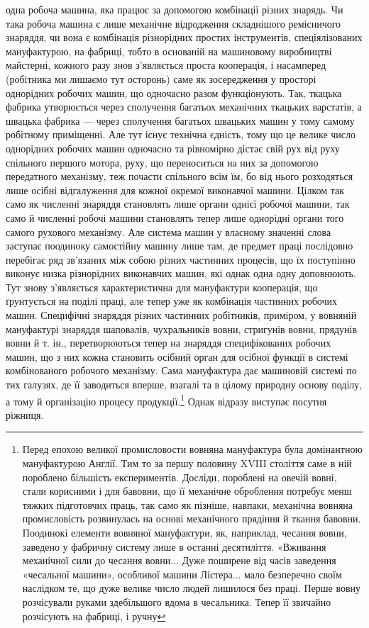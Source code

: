 \parcont{}  %
одна робоча машина, яка працює за допомогою комбінації різних
знарядь. Чи така робоча машина є лише механічне відродження
складнішого ремісничого знаряддя, чи вона є комбінація різнорідних
простих інструментів, спеціялізованих мануфактурою, на
фабриці, тобто в основаній на машиновому виробництві майстерні,
кожного разу знов з’являється проста кооперація, і насамперед
(робітника ми лишаємо тут осторонь) саме як зосередження у просторі
однорідних робочих машин, що одночасно разом функціонують.
Так, ткацька фабрика утворюється через сполучення
багатьох механічних ткацьких варстатів, а швацька фабрика —
через сполучення багатьох швацьких машин у тому самому робітному
приміщенні. Але тут існує технічна єдність, тому що це
велике число однорідних робочих машин одночасно та рівномірно
дістає свій рух від руху спільного першого мотора, руху, що
переноситься на них за допомогою передатного механізму, теж
почасти спільного всім їм, бо від нього розходяться лише осібні
відгалуження для кожної окремої виконавчої машини. Цілком
так само як численні знаряддя становлять лише органи однієї
робочої машини, так само й численні робочі машини становлять
тепер лише однорідні органи того самого рухового механізму.
Але система машин у власному значенні слова заступає
поодиноку самостійну машину лише там, де предмет праці послідовно
перебігає ряд зв’язаних між собою різних частинних
процесів, що їх поступінно виконує низка різнорідних виконавчих
машин, які однак одна одну доповнюють. Тут знову з’являється
характеристична для мануфактури кооперація, що ґрунтується
на поділі праці, але тепер уже як комбінація частинних
робочих машин. Специфічні знаряддя різних частинних робітників,
приміром, у вовняній мануфактурі знаряддя шаповалів,
чухральників вовни, стригунів вовни, прядунів вовни й т. ін.,
перетворюються тепер на знаряддя специфікованих робочих машин,
що з них кожна становить осібний орган для осібної функції
в системі комбінованого робочого механізму. Сама мануфактура
дає машиновій системі по тих галузях, де її заводиться вперше,
взагалі та в цілому природну основу поділу, а тому й організацію
процесу продукції.\footnote{
Перед епохою великої промисловости вовняна мануфактура була
домінантною мануфактурою Англії. Тим то за першу половину XVIII століття
саме в ній пороблено більшість експериментів. Досліди, пороблені
на овечій вовні, стали корисними і для бавовни, що її механічне
оброблення потребує менш тяжких підготовчих праць, так само як пізніше,
навпаки, механічна вовняна промисловість розвинулась на основі
механічного прядіння й ткання бавовни. Поодинокі елементи вовняної
мануфактури, як, наприклад, чесання вовни, заведено у фабричну систему
лише в останні десятиліття. «Вживання механічної сили до чесання вовни...
Дуже поширене від часів заведення «чесальної машини», особливої машини
Лістера... мало безперечно своїм наслідком те, що дуже велике число
людей лишилося без праці. Перше вовну розчісували руками здебільшого
вдома в чесальника. Тепер її звичайно розчісують на фабриці, і ручну
} Однак відразу виступає посутня ріжниця.
